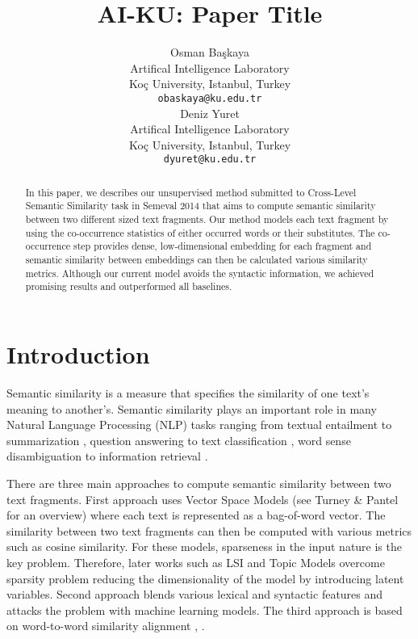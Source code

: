 \documentclass[11pt]{article}
\title{AI-KU: Paper Title}
\author{Osman Ba\c{s}kaya \\
	  Artifical Intelligence Laboratory \\
	  Ko\c{c} University, Istanbul, Turkey \\
  {\tt obaskaya@ku.edu.tr} \\\And
  Deniz Yuret \\
	  Artifical Intelligence Laboratory \\
	  Ko\c{c} University, Istanbul, Turkey \\
  {\tt dyuret@ku.edu.tr} \\}
\date{}
\begin{document}
\maketitle
\begin{abstract}

In this paper, we describes our unsupervised method submitted to Cross-Level Semantic Similarity task in Semeval 2014 that aims to compute semantic similarity between two different sized text fragments. Our method models each text fragment by using the co-occurrence statistics of either occurred words or their substitutes. The co-occurrence step provides dense, low-dimensional embedding for each fragment and semantic similarity between embeddings can then be calculated various similarity metrics. Although our current model avoids the syntactic information, we achieved promising results and outperformed all baselines.

\end{abstract}

\section{Introduction}
\label{intro}

Semantic similarity is a measure that specifies the similarity of one text's meaning to another's. Semantic similarity plays an important role in many Natural Language Processing (NLP) tasks ranging from textual entailment \cite{berant2012entail} to summarization \cite{lin2003summarization}, question answering \cite{surdeanu2011questionans} to text classification \cite{sebastiani2002textclass}, word sense disambiguation \cite{schutze98automatic} to information retrieval \cite{park2005infret}. 

There are three main approaches to compute semantic similarity between two text fragments. First approach uses Vector Space Models (see Turney \& Pantel  for an overview) where each text is represented as a bag-of-word vector. The similarity between two text fragments can then be computed with various metrics such as cosine similarity. For these models, sparseness in the input nature is the key problem. Therefore, later works such as LSI \cite{deerwester90indexing} and Topic Models \cite{blei03latent} overcome sparsity problem reducing the dimensionality of the model by introducing latent variables. Second approach blends various lexical and syntactic features and attacks the problem with machine learning models. The third approach is based on word-to-word similarity alignment \cite{pilehvar2013align}, \cite{islam2008semantic}.
\end{document}

